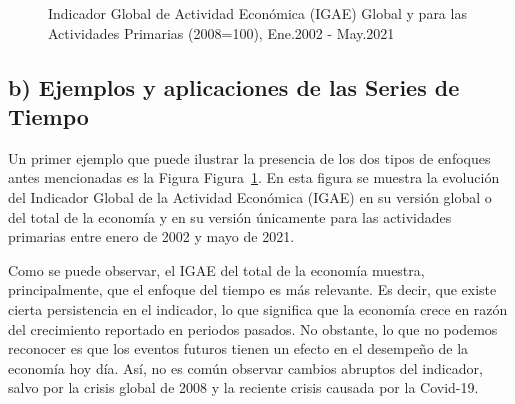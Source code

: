 \documentclass[
  a4paper,
]{article}
\begin{document}
\begin{figure}[H]

\caption{\label{fig-fig1}Indicador Global de Actividad Económica (IGAE)
Global y para las Actividades Primarias (2008=100), Ene.2002 - May.2021}


\end{figure}%

\subsection{b) Ejemplos y aplicaciones de las Series de
Tiempo}\label{b-ejemplos-y-aplicaciones-de-las-series-de-tiempo}

Un primer ejemplo que puede ilustrar la presencia de los dos tipos de
enfoques antes mencionadas es la Figura Figura~\ref{fig-fig1}. En esta
figura se muestra la evolución del Indicador Global de la Actividad
Económica (IGAE) en su versión global o del total de la economía y en su
versión únicamente para las actividades primarias entre enero de 2002 y
mayo de 2021.

Como se puede observar, el IGAE del total de la economía muestra,
principalmente, que el enfoque del tiempo es más relevante. Es decir,
que existe cierta persistencia en el indicador, lo que significa que la
economía crece en razón del crecimiento reportado en periodos pasados.
No obstante, lo que no podemos reconocer es que los eventos futuros
tienen un efecto en el desempeño de la economía hoy día. Así, no es
común observar cambios abruptos del indicador, salvo por la crisis
global de 2008 y la reciente crisis causada por la Covid-19.
\end{document}

